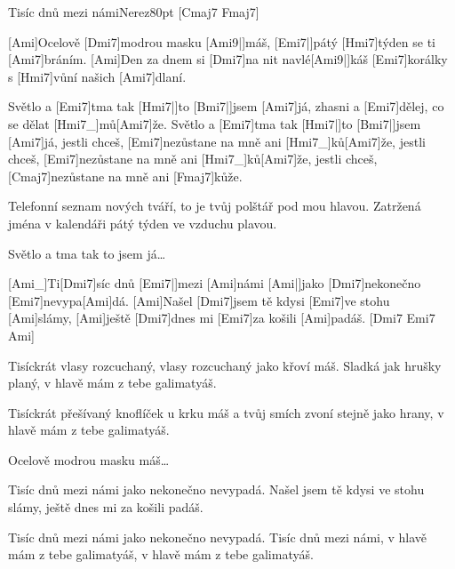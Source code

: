 \begin{song}{Tisíc dnů mezi námi}{Nerez}{80pt}
[Cmaj7 Fmaj7]

%
[Ami]Ocelově [Dmi7]modrou masku [Ami9|]{máš,} [Emi7|]{pátý} [Hmi7]týden se ti [Ami7]bráním.
[Ami]Den za dnem si [Dmi7]na nit navlé[Ami9|]{káš} [Emi7]korálky s [Hmi7]vůní našich [Ami7]dlaní.

\chorus%
Světlo a [Emi7]tma tak [Hmi7|]{to} [Bmi7|]{jsem} [Ami7]já,
zhasni a [Emi7]dělej, co se dělat [Hmi7_]{mů}[Ami7]{že}.
Světlo a [Emi7]tma tak [Hmi7|]{to} [Bmi7|]{jsem} [Ami7]já,
jestli chceš, [Emi7]nezůstane na mně ani [Hmi7_]{ků}[Ami7]{že},
jestli chceš, [Emi7]nezůstane na mně ani [Hmi7_]{ků}[Ami7]{že},
jestli chceš, [Cmaj7]nezůstane na mně ani [Fmaj7]kůže.

%
Telefonní seznam nových tváří, to je tvůj polštář pod mou hlavou.
Zatržená jména v kalendáři pátý týden ve vzduchu plavou.

\chorus%
Světlo a tma tak to jsem já\dots


[Ami_]{Ti}[Dmi7]síc dnů [Emi7|]{mezi} [Ami]námi
[Ami|]{jako} [Dmi7]nekonečno [Emi7]nevypa[Ami]dá.
[Ami]Našel [Dmi7]jsem tě kdysi [Emi7]ve stohu [Ami]slámy,
[Ami]ještě [Dmi7]dnes mi [Emi7]za košili [Ami]padáš. [Dmi7 Emi7 Ami]{} 	  	 

Tisíckrát vlasy rozcuchaný, vlasy rozcuchaný jako křoví máš.
Sladká jak hrušky planý, v hlavě mám z tebe galimatyáš.

Tisíckrát přešívaný knoflíček u krku máš
a tvůj smích zvoní stejně jako hrany, v hlavě mám z tebe galimatyáš.


Ocelově modrou masku máš\dots

Tisíc dnů mezi námi jako nekonečno nevypadá.
Našel jsem tě kdysi ve stohu slámy, ještě dnes mi za košili padáš.

Tisíc dnů mezi námi jako nekonečno nevypadá.
Tisíc dnů mezi námi, v hlavě mám z tebe galimatyáš, v hlavě mám z tebe galimatyáš.
\end{song}
\vfil
\hfil{}
\vfil
\hfil{}
